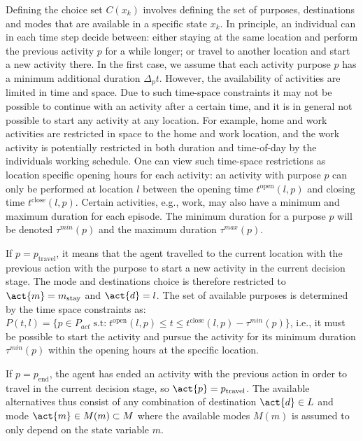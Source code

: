 Defining the choice set $C(x_k)$ involves defining the set of purposes, destinations and modes that are available in a specific state $x_k$.
In principle, an individual can in each time step decide between: either staying at the same location and perform the previous activity $p$ for a while longer; or travel to another location and start a new activity there. In the first case, we assume that each activity purpose $p$ has a minimum additional duration $\Delta_p t$.
However, the availability of activities are limited in time and space. Due to such time-space constraints it may not be possible to continue with an activity after a certain time, and it is in general not possible to start any activity at any location. For example, home and work activities are restricted in space to the home and work location, and the work activity is potentially restricted in both duration and time-of-day by the individuals working schedule. One can view such time-space restrictions as location specific opening hours for each activity: an activity with purpose $p$ can only be performed at location $l$ between the opening time $t^{\text{open}}({l,p})$ and closing time $t^{\text{close}}({l,p})$. Certain activities, e.g., work, may also have a minimum and maximum duration for each episode. The minimum duration for a purpose $p$ will be denoted $\tau^{min}(p) $ and the maximum duration $\tau^{max}(p)$. 

If $p=p_\text{travel}$, it means that the agent travelled to the current location with the previous action with the purpose to start a new activity in the current decision stage. The mode and destinations choice is therefore restricted to $\act{m} = m_{\text{stay}}$ and $\act{d}=l$. The set of available purposes is determined by the time space constraints as:
$P(t,l) = \big \{ p \in P_{act} \;\text{s.t:} \; t^{\text{open}}({l,p}) \leq t \leq t^{\text{close}}({l,p}) - \tau^{min}(p) \big \} $, i.e., it must be possible to start the activity and pursue the activity for its minimum duration $\tau^{min}(p)$ within the opening hours at the specific location.



If $p=p_\text{end}$, the agent has ended an activity with the previous action in order to travel in the current decision stage, so $\act{p}=p_\text{travel}$. The available alternatives thus consist of any combination of destination $\act{d} \in L$ and mode $\act{m}\in M(m)\subset M$ where the available modes $M(m)$ is assumed to only depend on the state variable $m$. 


